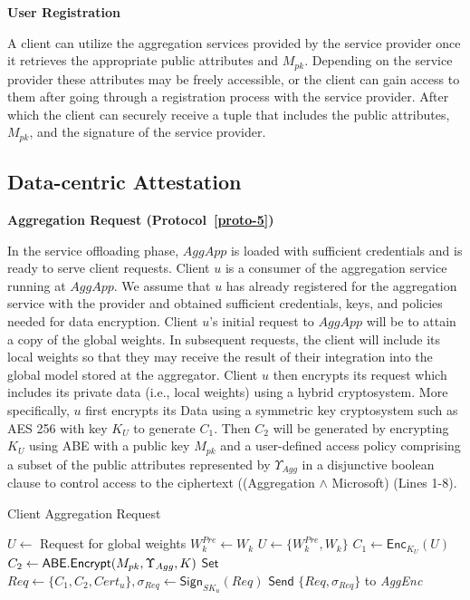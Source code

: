 \noindent
{\bf User Registration} %

\noindent
A client can utilize the aggregation services provided by the service provider once it retrieves the appropriate public attributes and $M_{pk}$. Depending on the service provider these attributes may be freely accessible, or the client can gain access to them after going through a registration process with the service provider. After which the client can securely receive a tuple that includes the public attributes, $M_{pk}$, and the signature of the service provider.






\subsection{Data-centric Attestation} 
\label{subsec05-02}
{\bf Aggregation Request (Protocol~\ref{proto-5})}

\noindent
In the service offloading phase, $AggApp$ is loaded with sufficient credentials and is ready to serve client requests.
Client $u$ is a consumer of the aggregation service running at $AggApp$. We assume that $u$ has already registered for the aggregation service with the provider and obtained sufficient credentials, keys, and policies needed for data encryption. Client $u$'s initial request to $AggApp$ will be to attain a copy of the global weights. In subsequent requests, the client will include its local weights so that they may receive the result of their integration into the global model stored at the aggregator. Client $u$ then encrypts its request which includes its private data (i.e., local weights) using a hybrid cryptosystem. More specifically, $u$ first encrypts its Data using a symmetric key cryptosystem such as AES 256 with key $K_U$ to generate $C_1$. Then $C_2$ will be generated by encrypting $K_U$ using ABE with a public key $M_{pk}$ and a user-defined access policy comprising a subset of the public attributes represented by $\Upsilon_{Agg}$ in a disjunctive boolean clause to control access to the ciphertext (\eg (Aggregation $\wedge$ Microsoft) (Lines 1-8).


\begin{algorithm}[!t]
\small
\caption{Client Aggregation Request}
\label{proto-5}
\begin{algorithmic}[1]
\STATE $U \gets$  Request for global weights
\ELSE
\STATE  $W_k^{Pre} \gets W_k$
\STATE $U \gets \{W_k^{Pre}, W_k\}$
\ENDIF
\STATE $C_1 \gets \mathsf{Enc}_{K_U}(U)$
\STATE $C_2 \gets \mathsf{ABE.Encrypt}(M_{pk}, \Upsilon_{Agg} , K)$
\STATE $\mathsf{Set}$ $Req \gets \{C_1, C_2, Cert_u\}, \sigma_{Req} \gets \mathsf{Sign}_{SK_u}(Req)$ 
\STATE $\mathsf{Send}$ $\{Req, \sigma_{Req}\}$ to {\it AggEnc} 
\end{algorithmic}
\end{algorithm}


